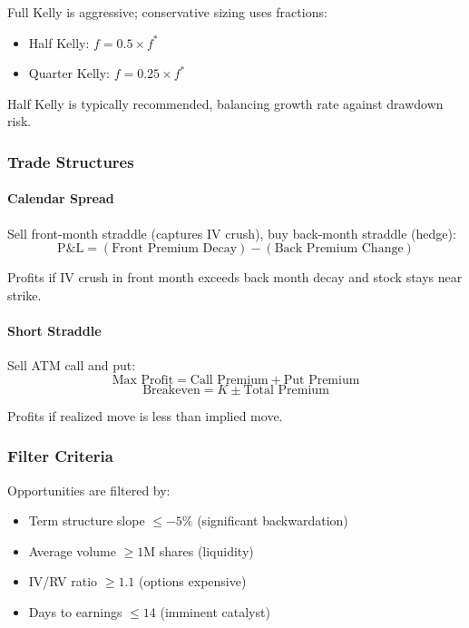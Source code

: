 Full Kelly is aggressive; conservative sizing uses fractions:
\begin{itemize}
  \item Half Kelly: $f = 0.5 \times f^*$
  \item Quarter Kelly: $f = 0.25 \times f^*$
\end{itemize}

Half Kelly is typically recommended, balancing growth rate against drawdown risk.

\subsubsection{Trade Structures}

\paragraph{Calendar Spread}

Sell front-month straddle (captures IV crush), buy back-month straddle (hedge):
\[
\text{P\&L} = (\text{Front Premium Decay}) - (\text{Back Premium Change})
\]

Profits if IV crush in front month exceeds back month decay and stock stays near strike.

\paragraph{Short Straddle}

Sell ATM call and put:
\[
\text{Max Profit} = \text{Call Premium} + \text{Put Premium}
\]
\[
\text{Breakeven} = K \pm \text{Total Premium}
\]

Profits if realized move is less than implied move.

\subsubsection{Filter Criteria}

Opportunities are filtered by:
\begin{itemize}
  \item Term structure slope $\leq -5\%$ (significant backwardation)
  \item Average volume $\geq 1$M shares (liquidity)
  \item IV/RV ratio $\geq 1.1$ (options expensive)
  \item Days to earnings $\leq 14$ (imminent catalyst)
\end{itemize}

